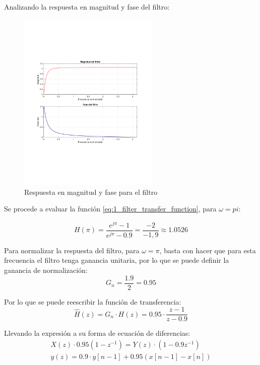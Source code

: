 \newpage
		Analizando la respuesta en magnitud y fase del filtro:
		\begin{figure}[H]
			\center
			\includegraphics[width=0.6\textwidth,clip, trim = {1.9cm 6.8cm 2.3cm 7cm}]{../plots/1_mag_phase.pdf}
			\caption{Respuesta en magnitud y fase para el filtro}
		\end{figure}
		
		Se procede a evaluar la función \ref{eq:1_filter_transfer_function}, para $\omega = pi$:
		
		\begin{equation}
			H(\pi) = \frac{e^{j\pi} - 1}{e^{j\pi} - 0.9} = \frac{-2}{-1,9} \approx 1.0526
			\label{eq:1_filter_pi}
		\end{equation}
		
		Para normalizar la respuesta del filtro, para $\omega = \pi$, basta con hacer que para esta frecuencia el filtro tenga ganancia unitaria, por lo que se puede definir la ganancia de normalización:
		\begin{equation}
			G_{n} = \frac{1.9}{2} = 0.95
		\end{equation}
		
		Por lo que se puede reescribir la función de transferencia:
		\begin{equation}
			\hat{H}(z) = G_{n} \cdot H(z) = 0.95 \cdot \frac{z - 1}{z -0.9} 
			\label{eq:1_transfer_function_normal}
		\end{equation}
		
		Llevando la expresión a su forma de ecuación de diferencias:
		\begin{align}
			X(z) \cdot 0.95 ( 1 - z^{-1} ) = Y(z) \cdot (1 - 0.9 z^{-1}) \\
			y(z) = 0.9 \cdot y\left[ n - 1 \right] + 0.95 \left( x\left[ n - 1 \right] - x\left[n \right] \right)
		\end{align}
		

